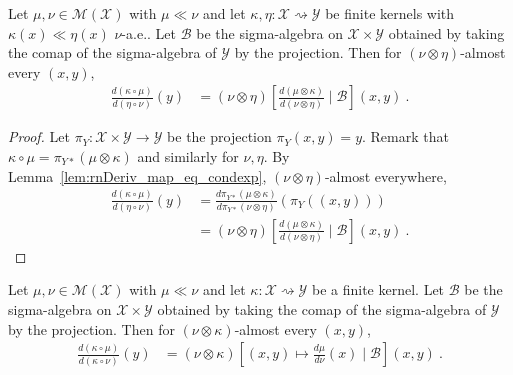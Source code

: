 \begin{lemma}
  \label{lem:rnDeriv_comp_eq_condexp}
  \leanok
  \uses{}
  Let $\mu, \nu \in \mathcal M(\mathcal X)$ with $\mu \ll \nu$ and let $\kappa, \eta : \mathcal X \rightsquigarrow \mathcal Y$ be finite kernels with $\kappa(x) \ll \eta(x)$ $\nu$-a.e..
  Let $\mathcal B$ be the sigma-algebra on $\mathcal X \times \mathcal Y$ obtained by taking the comap of the sigma-algebra of $\mathcal Y$ by the projection.
  Then for $(\nu \otimes \eta)$-almost every $(x,y)$,
  \begin{align*}
  \frac{d(\kappa \circ \mu)}{d(\eta \circ \nu)}(y)
  &= (\nu \otimes \eta)\left[ \frac{d (\mu \otimes \kappa)}{d (\nu \otimes \eta)} \mid \mathcal B \right](x,y)
  \: .
  \end{align*}
\end{lemma}

\begin{proof}\leanok
{}
Let $\pi_Y : \mathcal X \times \mathcal Y \to \mathcal Y$ be the projection $\pi_Y(x,y) = y$.
Remark that $\kappa \circ \mu = \pi_{Y*}(\mu \otimes \kappa)$ and similarly for $\nu, \eta$.
By Lemma~\ref{lem:rnDeriv_map_eq_condexp}, $(\nu \otimes \eta)$-almost everywhere,
\begin{align*}
\frac{d(\kappa \circ \mu)}{d(\eta \circ \nu)}(y)
&= \frac{d \pi_{Y*}(\mu \otimes \kappa)}{d \pi_{Y*}(\nu \otimes \eta)}(\pi_Y((x,y)))
\\
&= (\nu \otimes \eta)\left[ \frac{d (\mu \otimes \kappa)}{d (\nu \otimes \eta)} \mid \mathcal B\right](x,y)
\: .
\end{align*}
\end{proof}


\begin{lemma}
  \label{lem:rnDeriv_comp_eq_condexp_right}
  \leanok
  \uses{}
  Let $\mu, \nu \in \mathcal M(\mathcal X)$ with $\mu \ll \nu$ and let $\kappa : \mathcal X \rightsquigarrow \mathcal Y$ be a finite kernel.
  Let $\mathcal B$ be the sigma-algebra on $\mathcal X \times \mathcal Y$ obtained by taking the comap of the sigma-algebra of $\mathcal Y$ by the projection.
  Then for $(\nu \otimes \kappa)$-almost every $(x,y)$,
  \begin{align*}
  \frac{d(\kappa \circ \mu)}{d(\kappa \circ \nu)}(y)
  &= (\nu \otimes \kappa)\left[ (x, y) \mapsto \frac{d \mu}{d \nu}(x) \mid \mathcal B \right](x,y)
  \: .
  \end{align*}
  
\end{lemma}

